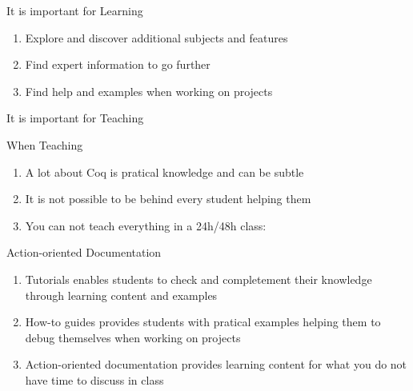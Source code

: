 \documentclass[10pt]{beamer}
\begin{document}
\begin{frame}{It is important for Learning}
  \begin{tcbProp}{}
    \begin{enumerate}
      \item Explore and discover additional subjects and features
      \item Find expert information to go further
      \item Find help and examples when working on projects
    \end{enumerate}
  \end{tcbProp}
\end{frame}

\begin{frame}{It is important for Teaching}
  \begin{tcbProp}{When Teaching}
    \begin{enumerate}
      \item<1-> A lot about Coq is pratical knowledge and can be subtle
      \item<2-> It is not possible to be behind every student helping them
      \item<3-> You can not teach everything in a 24h/48h class:
    \end{enumerate}
  \end{tcbProp}
  \begin{tcbSol}{Action-oriented Documentation}
    \begin{enumerate}
      \item<5-> Tutorials enables students to check and completement their knowledge
            through learning content and examples
      \item<6-> How-to guides provides students with pratical examples helping them
            to debug themselves when working on projects
      \item<7-> Action-oriented documentation provides learning content for what you
                do not have time to discuss in class
    \end{enumerate}
  \end{tcbSol}
\end{frame}
\end{document}

